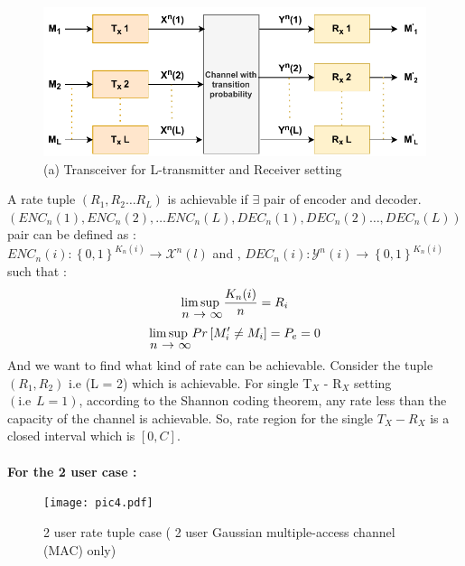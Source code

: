 \documentclass{article}
\begin{document}
 \begin{figure}[htb!]
 	\centering
 	\includegraphics[height=.20\textheight]{pic3.pdf}
 	\caption{(a) Transceiver for L-transmitter and Receiver setting } 
 	\label{fig3}
 \end{figure}
 
 
 A rate tuple $\left( R_{1}, R_{2} \dots R_{L} \right)$ is achievable if $\exists$ pair of encoder and decoder. \\
 $\left( ENC_{n}(1), ENC_{n} (2), \dots ENC_{n}(L), DEC_{n}(1), DEC_{n}(2) \dots , DEC_{n}(L)\right)$  pair can be defined as :\\
 $ENC_{n}(i) :\left\{0,1\right\}^{K_{n}(i)} \longrightarrow  \mathcal{X}^{n}(l) $ and ,
 $DEC_{n}(i) : \mathcal{Y}^{n}(i) \longrightarrow \left\{ 0,1 \right\}^{K_{n}(i)}$ such that : \\
\begin{align}
	\stackunder{$\limsup$ }{$n$ $\rightarrow$ $\infty$} \frac{K_{n}(i)}{n} = R_{i}
\end{align}
\begin{align}
	\stackunder{$\limsup$ }{$n$ $\rightarrow$ $\infty$} Pr \left[ M'_{i} \neq M_{i}\right] = P_{e} = 0 \label{2.4}
\end{align}
  And we want to find what kind of rate can be achievable. Consider the tuple $\left( R_{1}, R_{2}\right)$ i.e (L = 2) which is achievable. For single T$_{X}$ - R$_{X}$ setting $\left( \text{i.e} \hspace{5pt}  L = 1 \right)$, according to the Shannon coding theorem, any rate less than the capacity of the channel is achievable. So, rate region for the single $T_{X} - R_{X} $ is a closed interval which is $\left[ 0, C \right]$.\\  \\
  \textbf{ For the 2 user case :}
  \begin{figure}[htb!]
  	\centering
  	\texttt{[image: pic4.pdf]}
  	\caption{2 user rate tuple  case ( 2 user Gaussian multiple-access channel (MAC) only)}
  \end{figure}
\end{document}
